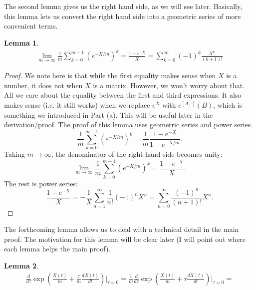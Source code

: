 \documentclass{article}
\theoremstyle{definition}
\newtheorem{lemma}{Lemma}
\newcommand{\f}[2]{\frac{#1}{#2}}
\newcommand{\lp}{\left(}
\newcommand{\rp}{\right)}
\begin{document}
\begin{enumerate}[label=(\alph*)]
	The second lemma gives us the right hand side, as we will see later. Basically, this lemma lets us convert the right hand side into a geometric series of more convenient terms. 
	\begin{lemma}\label{lem:2}
		\begin{align*}
		\lim_{m\to \infty} \f{1}{m} \sum^{m-1}_{k=0} \lp e^{-X/m} \rp^k = \f{1-e^{-X}}{X} = \sum^\infty_{k=0} (-1)^k \f{X^k}{(k+1)!}
		\end{align*}
	\end{lemma}
	\begin{proof}
		We note here is that while the first equality makes sense when $X$ is a number, it does not when $X$ is a matrix. However, we won't worry about that. All we care about the equality between the first and third expressions. It also makes sense (i.e. it still works) when we replace $e^X$ with $e^{[A,\cdot]}(B)$, which is something we introduced in Part (a). This will be useful later in the derivation/proof. The proof of this lemma uses geometric series and power series. 
		\begin{equation*}
		\f{1}{m}\sum^{m-1}_{k=0} \lp e^{-X/m} \rp^k = \f{1}{m}  \f{1-e^{-X}}{1-e^{-X/m}}. 
		\end{equation*}
		Taking $m\to \infty$, the denominator of the right hand side becomes unity: 
		\begin{equation*}
		\lim_{m\to \infty} \f{1}{m} \sum^{m-1}_{k=0} \lp e^{-X/m} \rp^k = \f{1-e^{-X}}{X}.
		\end{equation*}
		The rest is power series:
		\begin{equation*}
		\f{1-e^{-X}}{X} = -\f{1}{X} \sum^\infty_{n=1} \f{1}{n!}(-1)^nX^n = \sum^\infty_{n=0} \f{(-1)^{n}}{(n+1)!}X^{n}.
		\end{equation*}
	\end{proof}

	The forthcoming lemma allows us to deal with a technical detail in the main proof. The motivation for this lemma will be clear later (I will point out where each lemma helps the main proof). 
	\begin{lemma}\label{lem:3}
		\begin{align*}
		\f{d}{d\tau} \exp\lp \f{X(t)}{m} + \f{\tau}{m} \f{dX(t)}{dt}\rp \bigg\vert_{\tau = 0} = \f{1}{m} \f{d}{d\tau} \exp\lp \f{X(t)}{m} + \tau \f{dX(t)}{dt}\rp \bigg\vert_{\tau = 0} = 
		\end{align*}
	\end{lemma}


\end{enumerate}
\end{document}
